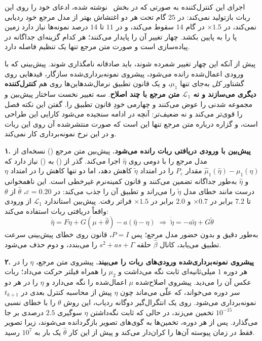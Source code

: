 \documentclass[10pt,twocolumn]{article}
\newcommand{\en}[1]{\lr{#1}}
\newcommand{\md}{\lr{\textemdash}}
\begin{document}
اجرای این کنترل‌کننده به صورتی که در بخش~\en{4.2} نوشته شده، ادعای خود را روی این
ربات بازتولید نمی‌کند: در $25$ گام تحت هر دو اغتشاش بهتر از مدل مرجع خود ردیابی
نمی‌کند، در $\times1.5$ در گام $14$ سقوط می‌کند، و در $11$ تا $14$ درصد نمونه‌ها نیاز
دارد زمین پا را به پایین بکشد. چهار تغییر آن را پایدار می‌کنند؛ هر کدام گزینه‌ای جداگانه در
پیاده‌سازی است و صورت متن مرجع تنها یک تنظیم فاصله دارد.

پیش از آنکه این چهار تغییر شمرده شوند، باید صادقانه نامگذاری شوند. پیش‌بینی که با
ورودی اعمال‌شده رانده می‌شود، پیشروی نمونه‌برداری‌شده سازگار، قیدهایی روی گشتاور
\emph{کل} به‌جای تنها $\mu_1$، و یک قانون تطبیق نرمال‌شده\md{}این‌ها روی هم
\textbf{کنترل‌کننده دیگری می‌سازند و نه $\mathcal{L}_1$ متن مرجع با چند اصلاح}. سه
تغییر نخست ساختار پیش‌بین و مجموعه شدنی را عوض می‌کنند و چهارمی خودِ قانون تطبیق را.
گفتن این نکته فصل را قوی‌تر می‌کند و نه ضعیف‌تر: آنچه در ادامه سنجیده می‌شود
کارایی این طراحی است، و گزاره درباره متن مرجع تنها این است که صورت منتشرشده آن روی
این ربات و در این نرخ نمونه‌برداری کار نمی‌کند.

\textbf{۱. پیش‌بین با ورودی دریافتی ربات رانده می‌شود.} پیش‌بین متن مرجع (\en{4.19})
نسخه‌ای از مدل مرجع را با \en{QP} دومی روی $\hat\eta$ اجرا می‌کند. گذر از (\en{4.24}) به
(\en{4.28}) نیاز دارد که $\hat\mu_1(\hat\eta)-\mu_1(\eta)$ مقدار $P_\varepsilon$ را در
امتداد $\tilde\eta$ کاهش دهد، اما دو \en{QP} تنها کاهش را در امتداد $\eta$ و
$\hat\eta$ به‌طور جداگانه تضمین می‌کنند و قانون کمینه‌نرم غیرخطی است. این ناهمخوانی
درست مانند خطای مدل $\tilde\eta$ را می‌راند و تطبیق آن را جذب می‌کند: در
$\varepsilon=0.20$، $\hat\theta$ از $\theta$ تا $7.2$ برابر در $\times0.7$ و $2.0$ برابر در
$\times1.5$ فراتر رفت. پیش‌بین
استاندارد $\mathcal{L}_1$ از ورودی واقعاً دریافتی ربات استفاده می‌کند:
\begin{equation}
    \dot{\hat\eta} = F\eta + G(\mu+\hat\theta) - a(\hat\eta-\eta)
    \;\Rightarrow\;
    \dot{\tilde\eta} = -a\tilde\eta + G\tilde\theta
    \label{eq:plant}
\end{equation}
به‌طور دقیق و بدون حضور مدل مرجع؛ پس $P=I$، قانون روی خطای پیش‌بینی سرعت تطبیق
می‌یابد، کانال $\hat\beta$ حلقه $s^2+as+\Gamma$ را می‌بندد، و \en{QP} دوم حذف
می‌شود.

\textbf{۲. پیشروی نمونه‌برداری‌شده ورودی‌های ربات را می‌بیند.} پیشروی متن مرجع،
$\eta$ را در هر دوره $1$ میلی‌ثانیه‌ای ثابت نگه می‌داشت و $\mu_2$ را همراه فیلتر
حرکت می‌داد؛ ربات عکس آن را می‌دید. پیشروی اصلاح‌شده $\mu$ اعمال‌شده را نگه می‌دارد و
$\eta$ را در هر دو سر دوره می‌خواند، که علّی می‌ماند چون $\eta$ پیش از محاسبه کنترل
بعدی در $t_{k+1}$ نمونه‌برداری می‌شود. روی یک انتگرال‌گیر دوگانه ردیاب، این روش
$\theta$ را با خطای نسبی $10^{-15}$ تخمین می‌زند، در حالی که ثابت نگه‌داشتن $\eta$
سوگیری $2.5$ درصدی بر جا می‌گذارد. پس از هر دوره، تخمین‌ها به گوی‌های تصویر
بازگردانده می‌شوند، زیرا تصویر فقط در زمان پیوسته آن‌ها را کران‌دار می‌کند و پیش
از این کار $\hat\theta$ یک بار به $10^{7}$ رسید.
\end{document}
